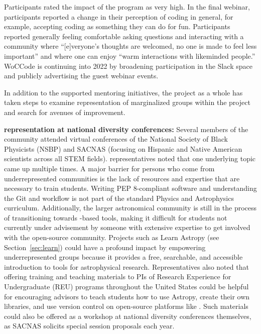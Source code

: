 \documentclass[modern]{aastex631}
\begin{document}
Participants rated the impact of the program as very high. In the
final webinar, participants reported a change in their perception of
coding in general, for example, accepting coding as something they can
do for fun. Participants reported generally feeling comfortable asking
questions and interacting with a community where ``[e]veryone's
thoughts are welcomed, no one is made to feel less important'' and
where one can enjoy ``warm interactions with likeminded people.''
WoCCode is continuing into 2022 by broadening participation in the
Slack space and publicly advertising the guest webinar events.

In addition to the supported mentoring initiatives, the \astropy
project as a whole has taken steps to examine representation of
marginalized groups within the project and search for avenues of
improvement.

\textbf{\astropy representation at national diversity conferences:}
Several members of the \astropy community attended virtual conferences of the
National Society of Black Physicists (NSBP) and SACNAS (focusing on Hispanic and
Native American scientists across all STEM fields). \astropy representatives
noted that one underlying topic came up multiple times. A major barrier for
persons who come from underrepresented communities is the lack of resources and
expertise that are necessary to train students. Writing PEP 8-compliant software
and understanding the Git and \github workflow is not part of the standard
Physics and Astrophysics curriculum. Additionally, the larger astronomical
community is still in the process of transitioning towards \python-based tools,
making it difficult for students not currently under advisement by someone with
extensive \python expertise to get involved with the open-source \python
community. Projects such as Learn Astropy (see Section~\ref{sec:learn}) could
have a profound impact by empowering underrepresented groups because it provides
a free, searchable, and accessible introduction to \python tools for
astrophysical research. Representatives also noted that offering training and
teaching materials to PIs of Research Experience for Undergraduate (REU)
programs throughout the United States could be helpful for encouraging advisors
to teach students how to use Astropy, create their own libraries, and use
version control on open-source platforms like \github. Such materials could also
be offered as a workshop at national diversity conferences themselves, as SACNAS
solicits special session proposals each year.
\end{document}
